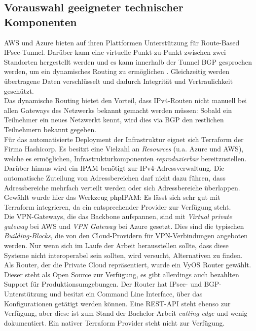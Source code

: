 \subsection{Vorauswahl geeigneter technischer Komponenten}
AWS und Azure bieten auf ihren Plattformen Unterstützung für Route-Based IPsec-Tunnel\cite[S.32]{awsvpn2021}. Darüber kann eine virtuelle Punkt-zu-Punkt zwischen zwei Standorten hergestellt werden und es kann innerhalb der Tunnel BGP gesprochen werden, um ein dynamisches Routing zu ermöglichen\cite[S. 18]{AlShawi2020} \cite[S. 74-79]{Toroman2019}. Gleichzeitig werden übertragene Daten verschlüsselt und dadurch Integrität und Vertraulichkeit geschützt.\\
Das dynamische Routing bietet den Vorteil, dass IPv4-Routen nicht manuell bei allen Gateways des Netzwerks bekannt gemacht werden müssen: Sobald ein Teilnehmer ein neues Netzwerkt kennt, wird dies via BGP den restlichen Teilnehmern bekannt gegeben.\\
Für das automatisierte \gls{Deployment} der Infrastruktur eignet sich Terraform der Firma Hashicorp. Es besitzt eine Vielzahl an \textit{Resources} (u.a. Azure und AWS), welche es ermöglichen, Infrastrukturkomponenten \textit{reproduzierbar} bereitzustellen.\\
Darüber hinaus wird ein IPAM benötigt zur IPv4-Adressverwaltung. Die automatische Zuteilung von Adressbereichen darf nicht dazu führen, dass Adressbereiche mehrfach verteilt werden oder sich Adressbereiche überlappen. Gewählt wurde hier das Werkzeug phpIPAM\cite{phpipam2020}: Es lässt sich sehr gut mit Terraform integrieren, da ein entsprechender Provider zur Verfügung steht\cite{phpipamtf2020}.\\
Die \gls{VPN-Gateway}s, die das Backbone aufspannen, sind mit \textit{Virtual private gateway} bei AWS und \textit{VPN Gateway} bei Azure gesetzt. Dies sind die typischen \textit{Building-Blocks}, die von den Cloud-Providern für VPN-Verbindungen angeboten werden. Nur wenn sich im Laufe der Arbeit herausstellen sollte, dass diese Systeme nicht interoperabel sein sollten, wird versucht, Alternativen zu finden.\\
Als Router, der die Private Cloud repräsentiert, wurde ein VyOS Router gewählt. Dieser steht als Open Source zur Verfügung, es gibt allerdings auch bezahlten Support für Produktionsumgebungen. Der Router hat IPsec- und BGP-Unterstützung und besitzt ein Command Line Interface, über das Konfigurationen getätigt werden können. Eine REST-API steht ebenso zur Verfügung, aber diese ist zum Stand der Bachelor-Arbeit \textit{cutting edge} und wenig dokumentiert\cite{vyosapi2021}. Ein nativer Terraform Provider steht nicht zur Verfügung.
